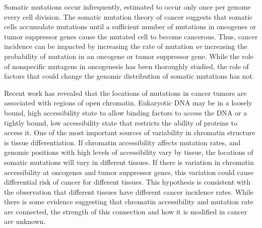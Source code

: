 
Somatic mutations occur infrequently, estimated to occur only once per genome every cell division.
The somatic mutation theory of cancer suggests that somatic cells accumulate mutations until a sufficient number of mutations in oncogenes or tumor suppressor genes cause the mutated cell to become cancerous.
Thus, cancer incidence can be impacted by increasing the rate of mutation \textit{or} increasing the probability of mutation in an oncogene or tumor suppressor gene.
While the role of nonspecific mutagens in oncogenesis has been thoroughly studied, the role of factors that could change the genomic distribution of somatic mutations has not.

Recent work has revealed that the locations of mutations in cancer tumors are associated with regions of open chromatin.
Eukaryotic DNA may be in a loosely bound, high accessibility state to allow binding factors to access the DNA or
a tightly bound, low accessibility state that restricts the ability of proteins to access it.
One of the most important sources of variability in chromatin structure is tissue differentiation.
If chromatin accessibility affects mutation rates, and genomic positions with high levels of accessibility vary by tissue, the locations of somatic mutations will vary in different tissues.
If there is variation in chromatin accessibility at oncogenes and tumor suppressor genes, this variation could cause differential risk of cancer for different tissues.
This hypothesis is consistent with the observation that different tissues have different cancer incidence rates.
While there is some evidence suggesting that chromatin accessibility and mutation rate are connected, the strength of this connection and how it is modified in cancer are unknown.

